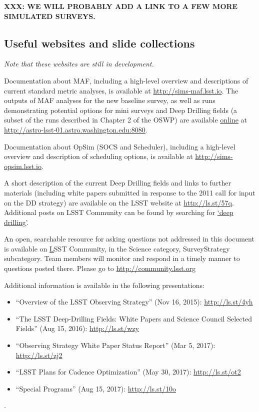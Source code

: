 \documentclass[DM,lsstdraft,toc,usenatbib]{lsstdoc}
\begin{document}
{\bf XXX: WE WILL PROBABLY ADD A LINK TO A FEW MORE SIMULATED SURVEYS.}


\subsection{Useful websites and slide collections}

{\it Note that these websites are still in development.}

Documentation about MAF, including a high-level overview and descriptions of current standard metric analyses, is available at \url{http://sims-maf.lsst.io}. 
The outputs of MAF analyses for the new baseline survey, as well as runs demonstrating potential options for mini surveys and Deep 
Drilling fields (a subset of the runs described in Chapter 2 of the OSWP) are available \href{http://astro-lsst-01.astro.washington.edu:8080}{online} at \url{http://astro-lsst-01.astro.washington.edu:8080}. 

Documentation about OpSim (SOCS and Scheduler), including a high-level overview and description of scheduling options, is available at \url{http://sims-opsim.lsst.io}.

A short description of the current Deep Drilling fields and links to further materials (including white papers submitted in response to the 2011 call for input on the DD strategy) are available on the LSST website at \href{https://www.lsst.org/scientists/survey-design/ddf}{http://ls.st/57q}. Additional posts on LSST Community can be found by searching for \href{https://community.lsst.org/search?q=deep%20drilling}{`deep drilling'}. 

An open, searchable resource for asking questions not addressed in this document is available on \href{http://community.lsst.org}LSST Community, in the Science category, SurveyStrategy subcategory. Team members will monitor and respond in a timely manner to questions posted there.  Please go to \url{http://community.lsst.org}

Additional information is available in the following presentations:
\begin{itemize}
\item ``Overview of the LSST Observing Strategy'' (Nov 16, 2015): \url{http://ls.st/4yh}
\item ``The LSST Deep-Drilling Fields: White Papers and Science Council Selected Fields'' (Aug 15, 2016): \url{http://ls.st/wzy}
\item ``Observing Strategy White Paper Status Report'' (Mar 5, 2017): \url{http://ls.st/zj2}
\item ``LSST Plans for Cadence Optimization'' (May 30, 2017): \url{http://ls.st/ot2}
\item ``Special Programs'' (Aug 15, 2017): \url{http://ls.st/10o}
\end{itemize}.
\end{document}
